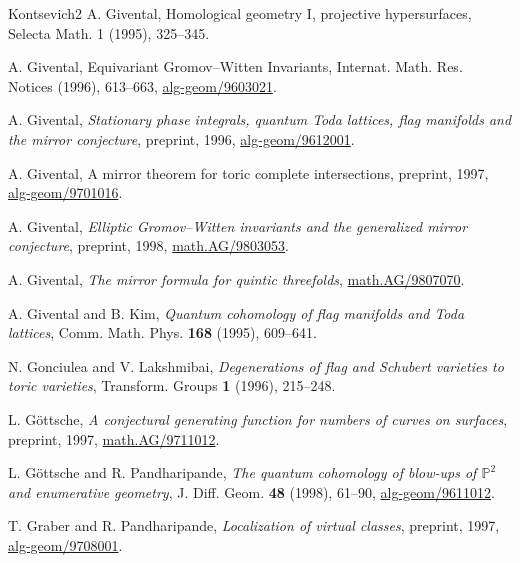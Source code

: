 \begin{thebibliography}{Kontsevich2}
\hypertarget{bib:Givental1}{}
A. Givental, Homological geometry I, projective hypersurfaces, Selecta Math. 1 (1995), 325--345.

\hypertarget{bib:Givental2}{}
A. Givental, Equivariant Gromov--Witten Invariants,
Internat. Math. Res. Notices (1996), 613--663, \href{https://arxiv.org/abs/alg-geom/9603021}{alg-geom/9603021}.

\hypertarget{bib:Givental3}{} A. Givental, \emph{Stationary phase integrals, quantum Toda lattices, flag manifolds and the mirror conjecture}, preprint, 1996, \href{https://arxiv.org/abs/alg-geom/9612001}{alg-geom/9612001}.

\hypertarget{bib:Givental4}{}
A. Givental, A mirror theorem for toric complete intersections,
preprint, 1997, \href{https://arxiv.org/abs/alg-geom/9701016}{alg-geom/9701016}.

\hypertarget{bib:Givental5}{}
A. Givental, \emph{Elliptic Gromov--Witten invariants and the generalized mirror conjecture}, preprint, 1998, \href{https://arxiv.org/abs/math/9803053}{math.AG/9803053}.

\hypertarget{bib:Givental6}{}
A. Givental, \emph{The mirror formula for quintic threefolds}, \href{https://arxiv.org/abs/math/9807070}{math.AG/9807070}.

\hypertarget{bib:GK}{} A. Givental and B. Kim, \emph{Quantum cohomology of flag manifolds and Toda lattices}, Comm. Math. Phys. \textbf{168} (1995), 609--641.

\hypertarget{bib:GL}{} N. Gonciulea and V. Lakshmibai, \emph{Degenerations of flag and Schubert varieties to toric varieties}, Transform. Groups \textbf{1} (1996), 215--248.

\hypertarget{bib:Gottsche}{} L. Göttsche, \emph{A conjectural generating function for numbers of curves on surfaces}, preprint, 1997, \href{https://arxiv.org/abs/alg-geom/9711012}{math.AG/9711012}.

\hypertarget{bib:GoP}{} L. Göttsche and R. Pandharipande, \emph{The quantum cohomology of blow-ups of $\mathbb P^2$ and enumerative geometry}, J. Diff. Geom. \textbf{48} (1998), 61--90, \href{https://arxiv.org/abs/alg-geom/9611012}{alg-geom/9611012}.

\hypertarget{bib:GPa}{} T. Graber and R. Pandharipande, \emph{Localization of virtual classes}, preprint, 1997, \href{https://arxiv.org/abs/alg-geom/9708001}{alg-geom/9708001}.


\end{thebibliography}
